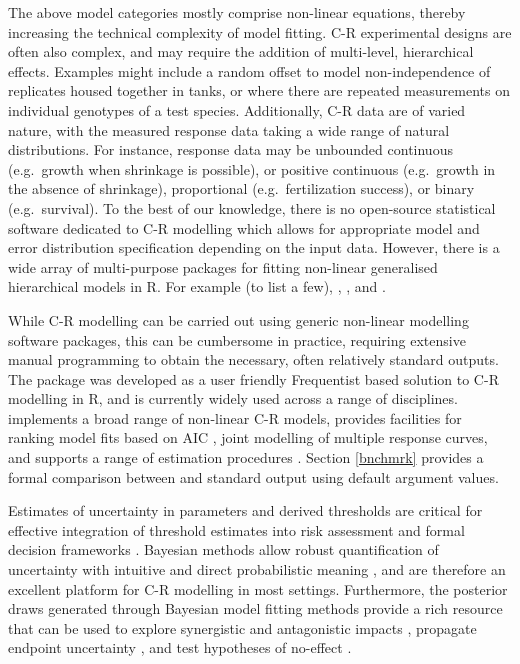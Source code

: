 \documentclass[
  shortnames]{jss}
\begin{document}
The above model categories mostly comprise non-linear equations, thereby increasing the technical complexity of model fitting. C-R experimental designs are often also complex, and may require the addition of multi-level, hierarchical effects. Examples might include a random offset to model non-independence of replicates housed together in tanks, or where there are repeated measurements on individual genotypes of a test species. Additionally, C-R data are of varied nature, with the measured response data taking a wide range of natural distributions. For instance, response data may be unbounded continuous (e.g.~growth when shrinkage is possible), or positive continuous (e.g.~growth in the absence of shrinkage), proportional (e.g.~fertilization success), or binary (e.g.~survival). To the best of our knowledge, there is no open-source statistical software dedicated to C-R modelling which allows for appropriate model and error distribution specification depending on the input data. However, there is a wide array of multi-purpose packages for fitting non-linear generalised hierarchical models in R. For example (to list a few),  \citep{pinheiro2021},  \citep{pinheiro2021},  \citep{Su2015} and  \citep{rstan2021}.

While C-R modelling can be carried out using generic non-linear modelling software packages, this can be cumbersome in practice, requiring extensive manual programming to obtain the necessary, often relatively standard outputs. The  package \citep{Ritz2016} was developed as a user friendly Frequentist based solution to C-R modelling in R, and is currently widely used across a range of disciplines.  implements a broad range of non-linear C-R models, provides facilities for ranking model fits based on AIC \citep{Burnham2002}, joint modelling of multiple response curves, and supports a range of estimation procedures \citep{Ritz2016}. Section \ref{bnchmrk} provides a formal comparison between  and  standard output using default argument values.

Estimates of uncertainty in parameters and derived thresholds are critical for effective integration of threshold estimates into risk assessment and formal decision frameworks \citep{fisher2018c}. Bayesian methods allow robust quantification of uncertainty with intuitive and direct probabilistic meaning \citep{Ellison1996}, and are therefore an excellent platform for C-R modelling in most settings. Furthermore, the posterior draws generated through Bayesian model fitting methods provide a rich resource that can be used to explore synergistic and antagonistic impacts \citep{Fisher2019d, flores2021}, propagate endpoint uncertainty \citep{Charles2020a, Gottschalk2013}, and test hypotheses of no-effect \citep{Thomas2006}.
\end{document}
